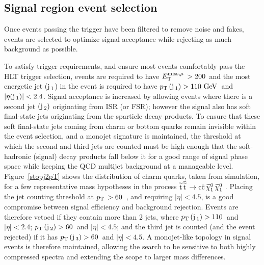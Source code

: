 \subsection{Signal region event selection}

Once events passing the trigger have been filtered to remove noise and fakes, 
events are selected to optimize signal acceptance while rejecting as much background as possible.

To satisfy trigger requirements, and ensure most events comfortably pass the \ac{HLT} trigger selection, 
events are required to have $E^{\rm miss, \mu}_{\rm T}\, > 200$~\GeV and the most energetic jet (${\rm j}\,_1$) in the event is required 
to have $p_{\text{T}}\,({\rm j}\,_1)>110~\mathrm{GeV}\,$ and $|\eta({\rm j}\,{}_1)|<2.4$.
Signal acceptance is increased by allowing events where there is a second jet $({\rm j}\,_2)$ originating from \ac{ISR} (or \ac{FSR}); 
however the signal also has soft final-state jets originating from the sparticle decay products.
%
To ensure that these soft final-state jets coming from charm or bottom quarks remain invisible within the event selection,
%
and a monojet signature is maintained,
the \pt threshold at which the second and third jets are counted must be high enough that
the soft-hadronic (signal) decay products 
fall below it for a good range of signal phase space 
while keeping the QCD multijet background at a manageable level.
%
Figure~\ref{stopj2pT} shows the \pt distribution of charm quarks, taken from simulation, 
for a few representative mass hypotheses in the process $\widetilde{{\rm t}}\, \overline{\widetilde{\mathrm{t}}}\, \rightarrow \rm c \bar{\rm c}\, \widetilde{\chi}^{0}_{1}\, \widetilde{\chi}^{0}_{1}\, \,$.
%
Placing the jet counting threshold at $p_{\text{T}}\, >60$~\GeV, and requiring $|\eta| < 4.5$,
is a good compromise between signal efficiency and background rejection.
%
Events are therefore vetoed if they contain more than 2 jets,
where $p_{\text{T}}\,({\rm j}\,_{1})>110$~\GeV and $|\eta|<2.4$; $p_{\text{T}}\,({\rm j}\,_{2})>60$~\GeV and $|\eta|<4.5$; 
and the third jet is counted (and the event rejected) if it has $p_{\text{T}}\,({\rm j}\,_{3})>60$~\GeV and $|\eta|<4.5$.
A monojet-like topology in signal events is therefore maintained, 
allowing the search to be sensitive to both highly compressed spectra
and extending the scope to larger mass differences.  


